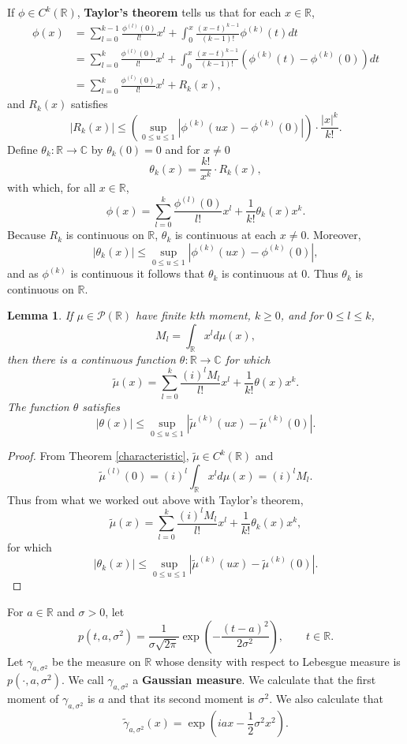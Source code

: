 \documentclass{article}
\newtheorem{lemma}[theorem]{Lemma}
\theoremstyle{definition}
\begin{document}
If $\phi \in C^k(\mathbb{R})$, \textbf{Taylor's theorem} tells us that for each
$x \in \mathbb{R}$,
\begin{align*}
\phi(x) &= \sum_{l=0}^{k-1} \frac{\phi^{(l)}(0)}{l!} x^l
+\int_0^x \frac{(x-t)^{k-1}}{(k-1)!} \phi^{(k)}(t)dt\\
&=\sum_{l=0}^k \frac{\phi^{(l)}(0)}{l!} x^l+\int_0^x \frac{(x-t)^{k-1}}{(k-1)!}(\phi^{(k)}(t)-\phi^{(k)}(0)) dt\\
&=\sum_{l=0}^k \frac{\phi^{(l)}(0)}{l!} x^l 
+R_k(x),
\end{align*}
and $R_k(x)$ satisfies
\[
|R_k(x)| \leq \left(\sup_{0 \leq u \leq 1} |\phi^{(k)}(ux)-\phi^{(k)}(0)|\right) \cdot \frac{|x|^k}{k!}.
\]
Define $\theta_k:\mathbb{R} \to \mathbb{C}$ by $\theta_k(0)=0$ and
for $x \neq 0$
\[
\theta_k(x) = \frac{k!}{x^k} \cdot R_k(x),
\]
with which, for all $x \in \mathbb{R}$,
\[
\phi(x) = \sum_{l=0}^k \frac{\phi^{(l)}(0)}{l!} x^l + \frac{1}{k!} \theta_k(x) x^k.
\]
Because $R_k$ is continuous on $\mathbb{R}$, $\theta_k$ is continuous at each $x \neq 0$.
Moreover,
\[
|\theta_k(x)| \leq \sup_{0 \leq u \leq 1} |\phi^{(k)}(ux)-\phi^{(k)}(0)|,
\]
and as $\phi^{(k)}$ is continuous it follows that
 $\theta_k$ is continuous at $0$. Thus $\theta_k$ is continuous on $\mathbb{R}$. 

\begin{lemma}
If $\mu \in \mathscr{P}(\mathbb{R})$ have finite $k$th moment, $k \geq 0$, and for $0 \leq l \leq k$,
\[
M_l = \int_\mathbb{R} x^l d\mu(x),
\]
then there is a continuous function $\theta:\mathbb{R} \to \mathbb{C}$ for which
\[
\tilde{\mu}(x) = \sum_{l=0}^k \frac{(i)^l M_l}{l!} x^l + \frac{1}{k!} \theta(x) x^k.
\]
The function $\theta$ satisfies
\[
|\theta(x)| \leq  \sup_{0 \leq u \leq 1} |\tilde{\mu}^{(k)}(ux)-\tilde{\mu}^{(k)}(0)|.
\]
\label{moments}
\end{lemma}
\begin{proof}
From  Theorem \ref{characteristic}, $\tilde{\mu} \in C^k(\mathbb{R})$ and
\[
\tilde{\mu}^{(l)}(0) = (i)^l \int_\mathbb{R} x^l d\mu(x) = (i)^l M_l.
\]
Thus from what we worked out above with Taylor's theorem,
\[
\tilde{\mu}(x) = \sum_{l=0}^k \frac{(i)^l M_l}{l!} x^l + \frac{1}{k!} \theta_k(x) x^k,
\]
for which
\[
|\theta_k(x)| \leq  \sup_{0 \leq u \leq 1} |\tilde{\mu}^{(k)}(ux)-\tilde{\mu}^{(k)}(0)|.
\]
\end{proof}



For $a \in \mathbb{R}$ and $\sigma>0$, 
let 
\[
p(t,a,\sigma^2) = \frac{1}{\sigma \sqrt{2\pi}} \exp\left( - \frac{(t-a)^2}{2\sigma^2} \right), \qquad  t \in\mathbb{R}.
\]
Let $\gamma_{a,\sigma^2}$ be the measure on $\mathbb{R}$ whose density with respect
to Lebesgue measure is $p(\cdot,a,\sigma^2)$. We call $\gamma_{a,\sigma^2}$ a \textbf{Gaussian measure}.
We calculate that the first moment of  $\gamma_{a,\sigma^2}$ is $a$ and that its second moment
is
$\sigma^2$. We also
calculate that
\[
\tilde{\gamma}_{a,\sigma^2}(x) = \exp\left(iax - \frac{1}{2}\sigma^2 x^2\right).
\]
\end{document}
